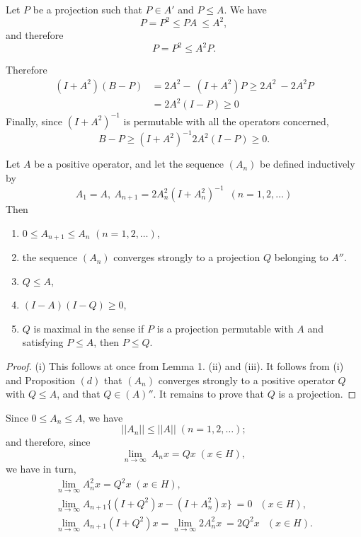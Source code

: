 Let $P$ be a projection such that $P \in A'$ and $P \leq A$. We have
$$
P = P^2 \leq PA ~ \leq A^2,
$$
and therefore
$$
P = P^2 \leq A^2 P.
$$

Therefore 
\begin{align*}
  (I+A^2) (B-P) & = 2A^2 - ~ (I+A^2) P \ge 2A^2 ~ - 2A^2 P\\ 
  & = 2A^2 (I - P) \ge 0
\end{align*}
Finally, since $(I + A^2)^{-1}$ is permutable with all the operators
concerned, 
$$
B - P \ge (I + A^2)^{-1} 2A^2 (I - P) \ge 0.
$$

\begin{thmm}\label{chap6:thm6.1} %
  Let $A$ be a positive operator, and let the sequence $(A_n)$ be
  defined inductively by  
  $$
  A_1 = A, ~  A_{n+1} = 2A^2_n (I + A^2_n)^{-1} ~ \; (n=1, 2, \ldots)
  $$
  Then\pageoriginale
  \begin{enumerate}[\rm i)]
  \item $0 \leq A_{n+1} \leq A_n$  \; $ (n=1,2, \ldots)$,

  \item the sequence $(A_n)$ converges strongly to a projection $Q$
    belonging to $A''$. 

  \item $Q \leq A$,

  \item $(I-A) (I-Q) \ge 0$,

  \item $Q$ is maximal in the sense if $P$ is a projection permutable
    with $A$ and satisfying $P \leq A$, then $P \leq Q$. 
  \end{enumerate}
\end{thmm}

\begin{proof}
  (i) This follows at once from Lemma 1. (ii) and (iii). It
  follows from (i) and Proposition $(d)$ that $(A_n)$ converges
  strongly to a positive operator $Q$ with $Q \le A$, and that $Q \in
  (A)''$. It remains to prove that $Q$ is a projection.  
\end{proof}

Since $0 \leq A_n \leq A$, we have
$$
|| A_n ||\leq || A || \;  (n = 1,2,\ldots);
$$
and therefore, since
$$
\lim_{n \to \infty} ~ A_n x = Qx \;  (x \in H),
$$
we have in turn, 
\begin{gather*}
  \lim_{n \to \infty} A^2_n x = Q^2 x \;  (x \in H),\\
  \lim_{n \to \infty} A_{n+1} \big \{ (I + Q^2) x - (I + A^2_n) x \big
  \} ~ = 0  \;  ~ ~(x \in H),\\ 
  \lim_{n \to \infty} A_{n+1} (I + Q^2) x = \lim_{n \to \infty} 2A^2_n
  x ~ = 2Q^2 x  \; ~ ~ (x \in H). 
\end{gather*}


